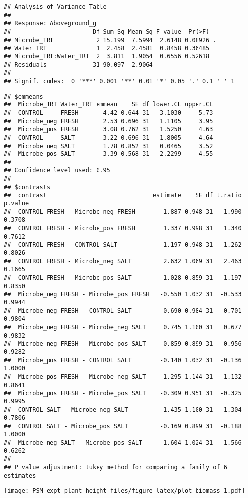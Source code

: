 \documentclass[
]{article}
\begin{document}
\begin{verbatim}
## Analysis of Variance Table
## 
## Response: Aboveground_g
##                       Df Sum Sq Mean Sq F value  Pr(>F)  
## Microbe_TRT            2 15.199  7.5994  2.6148 0.08926 .
## Water_TRT              1  2.458  2.4581  0.8458 0.36485  
## Microbe_TRT:Water_TRT  2  3.811  1.9054  0.6556 0.52618  
## Residuals             31 90.097  2.9064                  
## ---
## Signif. codes:  0 '***' 0.001 '**' 0.01 '*' 0.05 '.' 0.1 ' ' 1
\end{verbatim}

\begin{verbatim}
## $emmeans
##  Microbe_TRT Water_TRT emmean    SE df lower.CL upper.CL
##  CONTROL     FRESH       4.42 0.644 31   3.1030     5.73
##  Microbe_neg FRESH       2.53 0.696 31   1.1105     3.95
##  Microbe_pos FRESH       3.08 0.762 31   1.5250     4.63
##  CONTROL     SALT        3.22 0.696 31   1.8005     4.64
##  Microbe_neg SALT        1.78 0.852 31   0.0465     3.52
##  Microbe_pos SALT        3.39 0.568 31   2.2299     4.55
## 
## Confidence level used: 0.95 
## 
## $contrasts
##  contrast                              estimate    SE df t.ratio p.value
##  CONTROL FRESH - Microbe_neg FRESH        1.887 0.948 31   1.990  0.3708
##  CONTROL FRESH - Microbe_pos FRESH        1.337 0.998 31   1.340  0.7612
##  CONTROL FRESH - CONTROL SALT             1.197 0.948 31   1.262  0.8026
##  CONTROL FRESH - Microbe_neg SALT         2.632 1.069 31   2.463  0.1665
##  CONTROL FRESH - Microbe_pos SALT         1.028 0.859 31   1.197  0.8350
##  Microbe_neg FRESH - Microbe_pos FRESH   -0.550 1.032 31  -0.533  0.9944
##  Microbe_neg FRESH - CONTROL SALT        -0.690 0.984 31  -0.701  0.9804
##  Microbe_neg FRESH - Microbe_neg SALT     0.745 1.100 31   0.677  0.9832
##  Microbe_neg FRESH - Microbe_pos SALT    -0.859 0.899 31  -0.956  0.9282
##  Microbe_pos FRESH - CONTROL SALT        -0.140 1.032 31  -0.136  1.0000
##  Microbe_pos FRESH - Microbe_neg SALT     1.295 1.144 31   1.132  0.8641
##  Microbe_pos FRESH - Microbe_pos SALT    -0.309 0.951 31  -0.325  0.9995
##  CONTROL SALT - Microbe_neg SALT          1.435 1.100 31   1.304  0.7806
##  CONTROL SALT - Microbe_pos SALT         -0.169 0.899 31  -0.188  1.0000
##  Microbe_neg SALT - Microbe_pos SALT     -1.604 1.024 31  -1.566  0.6262
## 
## P value adjustment: tukey method for comparing a family of 6 estimates
\end{verbatim}

\texttt{[image: PSM\_expt\_plant\_height\_files/figure-latex/plot biomass-1.pdf]}
\end{document}
